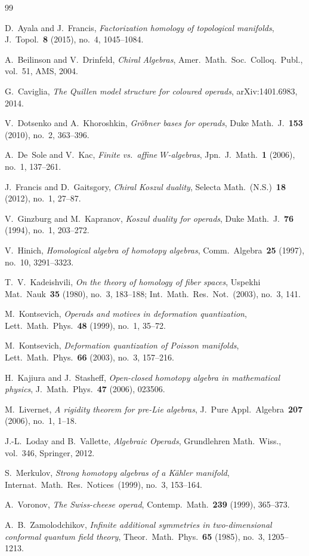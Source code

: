 \documentclass[11pt,reqno]{amsart}
\theoremstyle{definition}
\theoremstyle{remark}
\numberwithin{equation}{section}
\begin{document}
\begin{thebibliography}{99}

D.~Ayala and J.~Francis,
\emph{Factorization homology of topological manifolds},
J.~Topol.~\textbf{8} (2015), no.~4, 1045--1084.

A.~Beilinson and V.~Drinfeld,
\emph{Chiral Algebras},
Amer.\ Math.\ Soc.\ Colloq.\ Publ., vol.~51, AMS, 2004.

G.~Caviglia,
\emph{The Quillen model structure for coloured operads},
arXiv:1401.6983, 2014.

V.~Dotsenko and A.~Khoroshkin,
\emph{Gr\"obner bases for operads},
Duke Math.~J.~\textbf{153} (2010), no.~2, 363--396.

A.~De~Sole and V.~Kac,
\emph{Finite vs.\ affine $W$-algebras},
Jpn.~J.~Math.~\textbf{1} (2006), no.~1, 137--261.

J.~Francis and D.~Gaitsgory,
\emph{Chiral Koszul duality},
Selecta Math.~(N.S.)~\textbf{18} (2012), no.~1, 27--87.

V.~Ginzburg and M.~Kapranov,
\emph{Koszul duality for operads},
Duke Math.~J.~\textbf{76} (1994), no.~1, 203--272.

V.~Hinich,
\emph{Homological algebra of homotopy algebras},
Comm.~Algebra~\textbf{25} (1997), no.~10, 3291--3323.

T.~V.~Kadeishvili,
\emph{On the theory of homology of fiber spaces},
Uspekhi Mat.~Nauk~\textbf{35} (1980), no.~3, 183--188;
Int.\ Math.\ Res.\ Not.\ (2003), no.~3, 141.

M.~Kontsevich,
\emph{Operads and motives in deformation quantization},
Lett.~Math.~Phys.~\textbf{48} (1999), no.~1, 35--72.

M.~Kontsevich,
\emph{Deformation quantization of Poisson manifolds},
Lett.~Math.~Phys.~\textbf{66} (2003), no.~3, 157--216.

H.~Kajiura and J.~Stasheff,
\emph{Open-closed homotopy algebra in mathematical physics},
J.~Math.~Phys.~\textbf{47} (2006), 023506.

M.~Livernet,
\emph{A rigidity theorem for pre-Lie algebras},
J.~Pure Appl.~Algebra~\textbf{207} (2006), no.~1, 1--18.

J.-L.~Loday and B.~Vallette,
\emph{Algebraic Operads},
Grundlehren Math.~Wiss., vol.~346, Springer, 2012.

S.~Merkulov,
\emph{Strong homotopy algebras of a K\"ahler manifold},
Internat.\ Math.\ Res.\ Notices~(1999), no.~3, 153--164.

A.~Voronov,
\emph{The Swiss-cheese operad},
Contemp.~Math.~\textbf{239} (1999), 365--373.

A.~B.~Zamolodchikov,
\emph{Infinite additional symmetries in two-dimensional
conformal quantum field theory},
Theor.~Math.~Phys.~\textbf{65} (1985), no.~3, 1205--1213.

\end{thebibliography}
\end{document}
